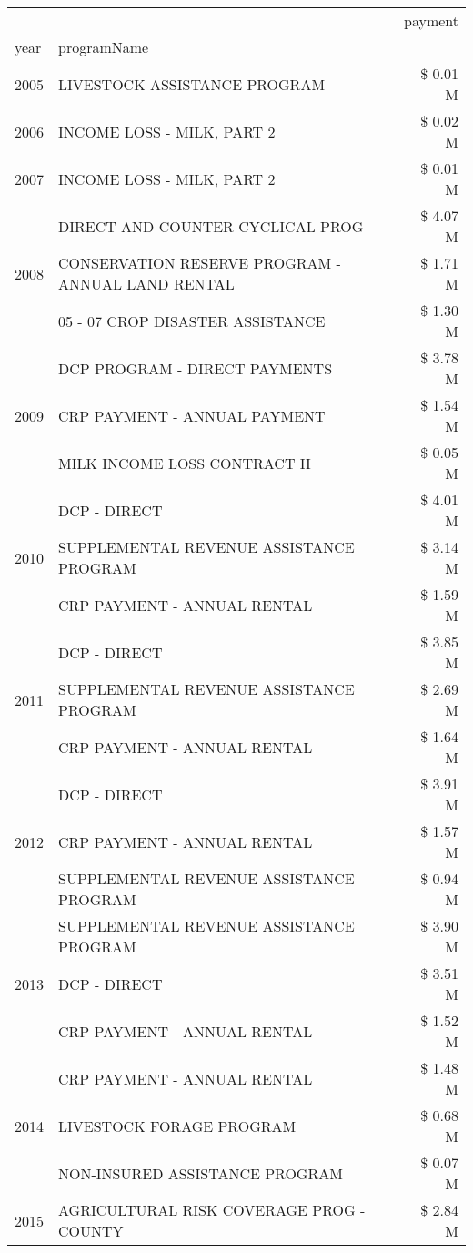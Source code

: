 \begin{tabular}{llr}
\toprule
 &  & payment \\
year & programName &  \\
\midrule
2005 & LIVESTOCK ASSISTANCE PROGRAM & \$ 0.01 M \\
\cline{1-3}
2006 & INCOME LOSS - MILK, PART 2 & \$ 0.02 M \\
\cline{1-3}
2007 & INCOME LOSS - MILK, PART 2 & \$ 0.01 M \\
\cline{1-3}
\multirow[t]{3}{*}{2008} & DIRECT AND COUNTER CYCLICAL PROG & \$ 4.07 M \\
 & CONSERVATION RESERVE PROGRAM - ANNUAL LAND RENTAL & \$ 1.71 M \\
 & 05 - 07 CROP DISASTER ASSISTANCE & \$ 1.30 M \\
\cline{1-3}
\multirow[t]{3}{*}{2009} & DCP PROGRAM - DIRECT PAYMENTS & \$ 3.78 M \\
 & CRP PAYMENT - ANNUAL PAYMENT & \$ 1.54 M \\
 & MILK INCOME LOSS CONTRACT II & \$ 0.05 M \\
\cline{1-3}
\multirow[t]{3}{*}{2010} & DCP - DIRECT & \$ 4.01 M \\
 & SUPPLEMENTAL REVENUE ASSISTANCE PROGRAM & \$ 3.14 M \\
 & CRP PAYMENT - ANNUAL RENTAL & \$ 1.59 M \\
\cline{1-3}
\multirow[t]{3}{*}{2011} & DCP - DIRECT & \$ 3.85 M \\
 & SUPPLEMENTAL REVENUE ASSISTANCE PROGRAM & \$ 2.69 M \\
 & CRP PAYMENT - ANNUAL RENTAL & \$ 1.64 M \\
\cline{1-3}
\multirow[t]{3}{*}{2012} & DCP - DIRECT & \$ 3.91 M \\
 & CRP PAYMENT - ANNUAL RENTAL & \$ 1.57 M \\
 & SUPPLEMENTAL REVENUE ASSISTANCE PROGRAM & \$ 0.94 M \\
\cline{1-3}
\multirow[t]{3}{*}{2013} & SUPPLEMENTAL REVENUE ASSISTANCE PROGRAM & \$ 3.90 M \\
 & DCP - DIRECT & \$ 3.51 M \\
 & CRP PAYMENT - ANNUAL RENTAL & \$ 1.52 M \\
\cline{1-3}
\multirow[t]{3}{*}{2014} & CRP PAYMENT - ANNUAL RENTAL & \$ 1.48 M \\
 & LIVESTOCK FORAGE PROGRAM & \$ 0.68 M \\
 & NON-INSURED ASSISTANCE PROGRAM & \$ 0.07 M \\
\cline{1-3}
\multirow[t]{3}{*}{2015} & AGRICULTURAL RISK COVERAGE PROG - COUNTY & \$ 2.84 M \\

\end{tabular}
